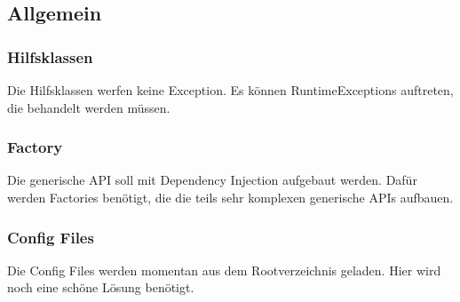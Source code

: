\documentclass[11pt]{scrartcl}
\begin{document}
\subsection{Allgemein}
\subsubsection{Hilfsklassen}
Die Hilfsklassen werfen keine Exception.
Es können RuntimeExceptions auftreten, die behandelt werden müssen.

\subsubsection{Factory}
Die generische API soll mit Dependency Injection aufgebaut werden.
Dafür werden Factories benötigt, die die teils sehr komplexen generische APIs aufbauen.

\subsubsection{Config Files}
Die Config Files werden momentan aus dem Rootverzeichnis geladen.
Hier wird noch eine schöne Lösung benötigt.
\end{document}
